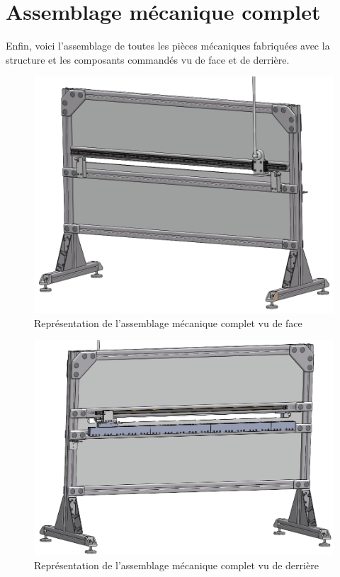 \section{Assemblage mécanique complet}\label{sec:AssMecComp}
Enfin, voici l'assemblage de toutes les pièces mécaniques fabriquées avec la structure et les composants commandés vu de face et de derrière.

\begin{figure}[H]
    \centering
    \includegraphics[width = \textwidth]{assets/figures/AssemblageCompletFace.png}
    \caption{Représentation de l'assemblage mécanique complet vu de face}
    \label{fig:AssCompFace}
\end{figure}

\begin{figure}[H]
    \centering
    \includegraphics[width = \textwidth]{assets/figures/AssemblageCompletDerriere.png}
    \caption{Représentation de l'assemblage mécanique complet vu de derrière}
    \label{fig:AssCompDerriere}
\end{figure}
